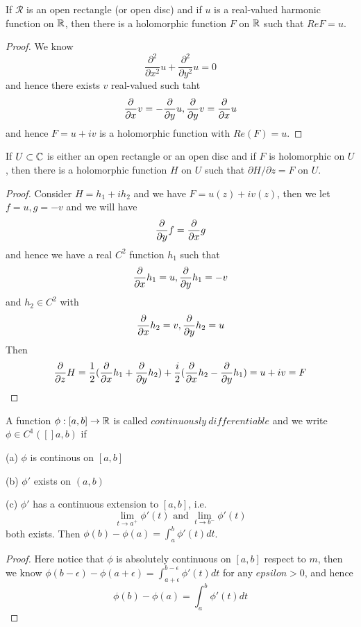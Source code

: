 \begin{corollary}
    If $\mathcal{R}$ is an open rectangle (or open disc) and if $u$ is a real-valued harmonic function on $\mathbb{R}$, then there is a holomorphic function $F$ on $\mathbb{R}$ such that $Re F = u$.
\end{corollary}
\begin{proof}\par
    We know 
    \[\dfrac{\partial^2}{\partial x^2} u + \dfrac{\partial^2}{\partial y^2} u =0\]
    and hence there exists $v$ real-valued such taht
    \[\dfrac{\partial}{\partial x} v = - \dfrac{\partial}{\partial y} u, \dfrac{\partial}{\partial y} v = \dfrac{\partial}{\partial x} u\]
    and hence $F = u+iv$ is a holomorphic function with $Re(F) = u$.
\end{proof}

\begin{theorem}
    If $U\subset \mathbb{C}$ is either an open rectangle or an open disc and if $F$ is holomorphic on $U$, then there is a holomorphic function $H$ on $U$ such that $\partial H/\partial z = F$ on $U$. 
\end{theorem}
\begin{proof}\par
    Consider $H = h_1 + ih_2$ and 
    we have $F = u(z) + iv(z)$, then we let $f= u ,g = -v$ and we will have
    \[\dfrac{\partial}{\partial y} f = \dfrac{\partial}{\partial x} g\]
    and hence we have a real $C^2$ function $h_1$ such that
    \[\dfrac{\partial}{\partial x} h_1 = u, \dfrac{\partial}{\partial y} h_1 = -v\]
    and $h_2 \in C^2$ with
    \[\dfrac{\partial}{\partial x} h_2 = v, \dfrac{\partial}{\partial y} h_2 = u\]
    Then
    \[\dfrac{\partial}{\partial z} H = \dfrac{1}{2}(\dfrac{\partial}{\partial x} h_1 + \dfrac{\partial}{\partial y} h_2)+\dfrac{i}{2}(\dfrac{\partial}{\partial x} h_2 - \dfrac{\partial}{\partial y} h_1) = u+iv = F\]
\end{proof}

\begin{definition}
    A function $\phi:[a,b]\to\mathbb{R}$ is called $continuously\ differentiable$ and we write $\phi\in C^1([]a,b)$ if\par
    (a) $\phi$ is continous on $[a,b]$\par
    (b) $\phi'$ exists on $(a,b)$\par
    (c) $\phi'$ has a continuous extension to $[a,b]$, i.e.
    \[\lim_{t\to a^+} \phi'(t)\text{ and }\lim_{t\to b^-} \phi'(t)\]
    both exists. Then $\phi(b)-\phi(a) = \int_a^b \phi'(t)dt$.
\end{definition}
\begin{proof}\par
    Here notice that $\phi$ is absolutely continuous on $[a,b]$ respect to $m$, then we know $\phi(b-\epsilon) - \phi(a+\epsilon) = \int_{a+\epsilon}^{b-\epsilon} \phi'(t)dt$ for any $epsilon > 0$, and hence
    \[\phi(b)-\phi(a) = \int_a^b \phi'(t) dt\]    
\end{proof}


